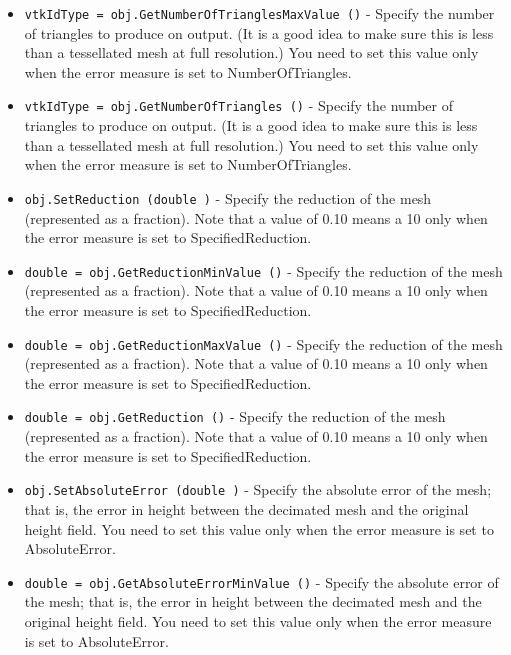 \begin{itemize}
\item  \verb|vtkIdType = obj.GetNumberOfTrianglesMaxValue ()| -  Specify the number of triangles to produce on output. (It is a
 good idea to make sure this is less than a tessellated mesh
 at full resolution.) You need to set this value only when
 the error measure is set to NumberOfTriangles.

\item  \verb|vtkIdType = obj.GetNumberOfTriangles ()| -  Specify the number of triangles to produce on output. (It is a
 good idea to make sure this is less than a tessellated mesh
 at full resolution.) You need to set this value only when
 the error measure is set to NumberOfTriangles.

\item  \verb|obj.SetReduction (double )| -  Specify the reduction of the mesh (represented as a fraction).  Note
 that a value of 0.10 means a 10%
 only when the error measure is set to SpecifiedReduction.

\item  \verb|double = obj.GetReductionMinValue ()| -  Specify the reduction of the mesh (represented as a fraction).  Note
 that a value of 0.10 means a 10%
 only when the error measure is set to SpecifiedReduction.

\item  \verb|double = obj.GetReductionMaxValue ()| -  Specify the reduction of the mesh (represented as a fraction).  Note
 that a value of 0.10 means a 10%
 only when the error measure is set to SpecifiedReduction.

\item  \verb|double = obj.GetReduction ()| -  Specify the reduction of the mesh (represented as a fraction).  Note
 that a value of 0.10 means a 10%
 only when the error measure is set to SpecifiedReduction.

\item  \verb|obj.SetAbsoluteError (double )| -  Specify the absolute error of the mesh; that is, the error in height
 between the decimated mesh and the original height field.  You need to
 set this value only when the error measure is set to AbsoluteError.

\item  \verb|double = obj.GetAbsoluteErrorMinValue ()| -  Specify the absolute error of the mesh; that is, the error in height
 between the decimated mesh and the original height field.  You need to
 set this value only when the error measure is set to AbsoluteError.


\end{itemize}
